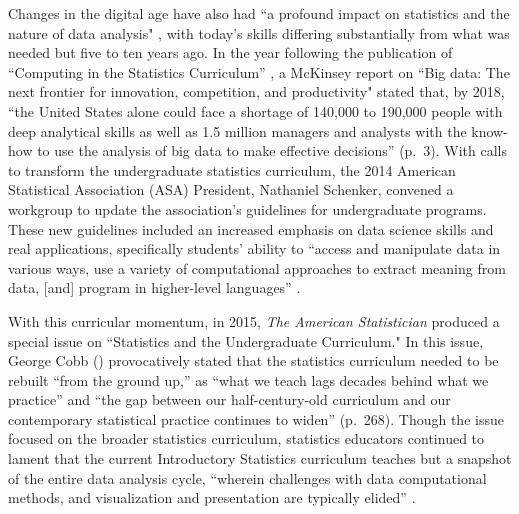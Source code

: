 \documentclass[12pt]{article}
\begin{document}
\noindent Changes in the digital age have also had ``a profound impact on
statistics and the nature of data analysis" \citep[p.\ 97]{nolan}, with today's
skills differing substantially from what was needed but five to ten years ago. 
In the year following the publication of ``Computing in the Statistics 
Curriculum'' \citep{nolan}, a McKinsey report on ``Big data: The next frontier
for innovation, competition, and productivity" \citep{mckinsey}
stated that, by 2018, ``the United States alone could face a
shortage of 140,000 to 190,000 people with deep analytical skills as well as 1.5
million managers and analysts with the know-how to use the analysis of big data
to make effective decisions'' (p.\ 3). With calls to transform the undergraduate
statistics curriculum, the 2014 American Statistical 
Association (ASA) President, Nathaniel Schenker, convened a workgroup to update
the association's guidelines for undergraduate programs. These new guidelines 
included an increased emphasis on data science skills and real applications, 
specifically students' ability to ``access and manipulate data in various ways,
use a variety of computational approaches to extract meaning from data, [and] 
program in higher-level languages'' \citep[p.\ 7]{asa}. 

\quad With this curricular momentum, in 2015, \emph{The American Statistician} 
produced a special issue on ``Statistics and the Undergraduate Curriculum." 
In this issue, George Cobb (\citeyear{cobb}) provocatively stated that the
statistics curriculum needed to be rebuilt ``from the ground up,'' as ``what we
teach lags decades behind what we practice'' and ``the gap between our
half-century-old curriculum and our contemporary statistical practice continues
to widen'' (p.\ 268). Though the issue focused on the broader statistics
curriculum, statistics educators continued to lament that the current
Introductory Statistics curriculum teaches but a snapshot of the entire data
analysis cycle, ``wherein challenges with data computational methods, and
visualization and presentation are typically elided'' 
\citep[p.\ 336]{baumer_datascience}. 
\end{document}
